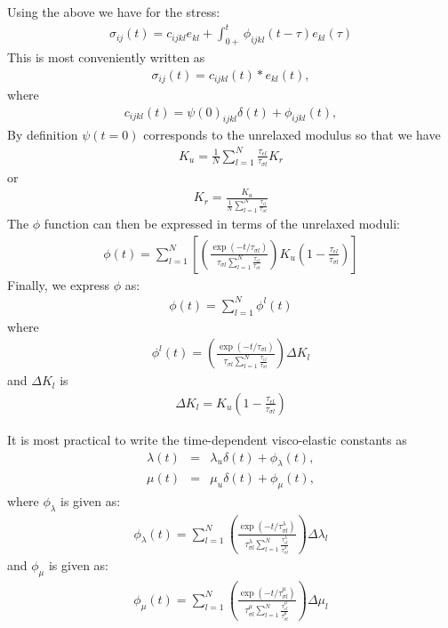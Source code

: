 \documentclass[11pt]{article}
\begin{document}
Using the above we have for the stress:
\begin{eqnarray}
\sigma_{ij}(t)=c_{ijkl}e_{kl} +\int_{0+}^t \phi_{ijkl}(t-\tau)e_{kl}(\tau)
\end{eqnarray}
This is most conveniently written as
\begin{eqnarray}
\sigma_{ij}(t)=c_{ijkl}(t)*e_{kl}(t),
\end{eqnarray}
where
\begin{eqnarray}
 c_{ijkl}(t)=\psi(0)_{ijkl}\delta(t) +\phi_{ijkl}(t),
\end{eqnarray}
%
By definition $\psi(t=0)$ corresponds to the unrelaxed modulus so that we have
\begin{eqnarray}
K_u = \frac{1}{N}\sum_{l=1}^N \frac{\tau_{\epsilon l}}{\tau_{\sigma l}} K_r
\end{eqnarray}
or
\begin{eqnarray}
K_r = \frac{K_u}{\frac{1}{N}\sum_{l=1}^N \frac{\tau_{\epsilon l}}{\tau_{\sigma l}}}
\end{eqnarray}
The $\phi$ function can then be expressed in terms of the unrelaxed moduli:
\begin{eqnarray}
\phi(t) =   
  \sum_{l=1}^N\left[\left(\frac{\exp(-t/\tau_{\sigma l})}
       {\tau_{\sigma l}\sum_{l=1}^N \frac{\tau_{\epsilon l}}
       {\tau_{\sigma l}}}\right)
       K_u\left(1-\frac{\tau_{\epsilon l}}{\tau_{\sigma l}}\right)\right]
\end{eqnarray}
Finally, we express $\phi$ as:
\begin{eqnarray}
\phi(t) = \sum_{l=1}^N \phi^l(t)
\end{eqnarray}
where
\begin{eqnarray}
\phi^l(t) = 
  \left(\frac{\exp(-t/\tau_{\sigma l})}{\tau_{\sigma l}\sum_{l=1}^N 
  \frac{\tau_{\epsilon l}}{\tau_{\sigma l}}}\right)
            \Delta K_l
             \label{eq:phil}
\end{eqnarray}
and $\Delta K_l$ is
\begin{eqnarray}
\Delta K_l = K_u\left(1-\frac{\tau_{\epsilon l}}{\tau_{\sigma l}}\right)
\end{eqnarray}

It is most practical to write the time-dependent visco-elastic constants as
\begin{eqnarray}
  \lambda(t) & = & \lambda_u \delta(t) + \phi_{\lambda}(t), \\
  \mu(t)    &  =  &\mu_u\delta(t)+\phi_{\mu}(t),
\end{eqnarray}
where
%
$\phi_{\lambda}$ is given as:
\begin{eqnarray}
  \phi_{\lambda}(t) = \sum_{l=1}^N 
  \left(\frac{\exp(-t/\tau^{\lambda}_{\sigma l})}{\tau^{\lambda}_{\sigma l}\sum_{l=1}^N \frac{\tau^{\lambda}_{\epsilon l}}{\tau^{\lambda}_{\sigma l}}}\right)
            \Delta \lambda_l
\end{eqnarray}
%
and $\phi_{\mu}$ is given as:
\begin{eqnarray}
  \phi_{\mu}(t) = \sum_{l=1}^N 
  \left(\frac{\exp(-t/\tau^{\mu}_{\sigma l})}{\tau^{\mu}_{\sigma l}\sum_{l=1}^N \frac{\tau^{\mu}_{\epsilon l}}{\tau^{\mu}_{\sigma l}}}\right)
            \Delta \mu_l
\end{eqnarray}
\end{document}
